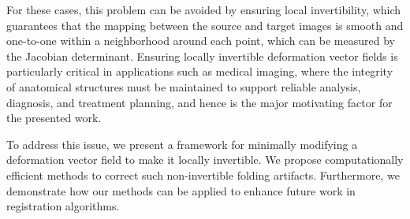 For these cases, this problem can be avoided by ensuring local invertibility, which guarantees that the mapping between the source and target images is smooth and one-to-one within a neighborhood around each point, which can be measured by the Jacobian determinant. Ensuring locally invertible deformation vector fields is particularly critical in applications such as medical imaging, where the integrity of anatomical structures must be maintained to support reliable analysis, diagnosis, and treatment planning, and hence is the major motivating factor for the presented work. 

To address this issue, we present a framework for minimally modifying a deformation vector field to make it locally invertible. We propose computationally efficient methods to correct such non-invertible folding artifacts. Furthermore, we demonstrate how our methods can be applied to enhance future work in registration algorithms.




